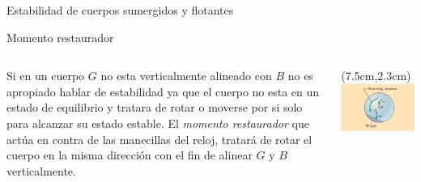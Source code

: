 \documentclass [xcolor=svgnames, t] {beamer}
\begin{document}
\begin{frame}{Estabilidad de cuerpos sumergidos y flotantes}
\begin{block}{Momento restaurador}
\begin{columns}
Si en un cuerpo $G$ no esta verticalmente alineado con $B$ no es apropiado hablar de estabilidad ya que el cuerpo no esta en un estado de equilibrio y tratara de rotar o moverse por si solo para alcanzar su estado estable. El \emph{momento restaurador} que act\'ua en contra de las manecillas del reloj, tratar\'a de rotar el cuerpo en la misma direcci\'on con el fin de alinear $G$ y $B$ verticalmente.
\begin{textblock*}{5cm}(7.5cm,2.3cm) %
\includegraphics[width=\textwidth]{rota2}
\end{textblock*}
\end{columns}
\end{block}
\end{frame}
\end{document}
